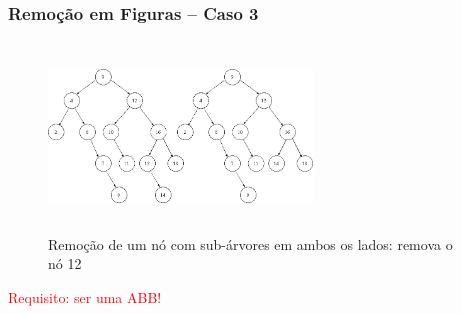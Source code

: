 \begin{frame}

\frametitle{Remoção em Figuras  -- Caso 3}

   \begin{figure}[!ht]
    \centering
    \includegraphics[width=7cm, height=5cm]{figs/fig_arvores/remove2_arvore.jpg}
    \caption{Remoção de um nó com sub-árvores em ambos os lados: remova o nó 12}
    \end{figure}

\begin{flushleft}
\textcolor{red}{Requisito: ser uma ABB!}
\end{flushleft}


\end{frame}

